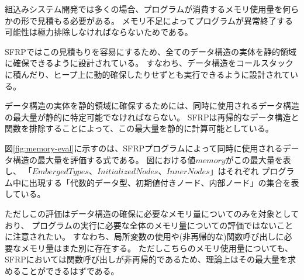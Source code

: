 組込みシステム開発では多くの場合、プログラムが消費するメモリ使用量を何らかの形で見積もる必要がある。
メモリ不足によってプログラムが異常終了する可能性は極力排除しなければならないためである。

SFRPではこの見積もりを容易にするため、全てのデータ構造の実体を静的領域に確保できるように設計されている。
すなわち、データ構造をコールスタックに積んだり、ヒープ上に動的確保したりせずとも実行できるように設計されている。

データ構造の実体を静的領域に確保するためには、同時に使用されるデータ構造の最大量が静的に特定可能でなければならない。
SFRPは再帰的なデータ構造と関数を排除することによって、この最大量を静的に計算可能としている。

図\ref{fig:memory-eval}に示すのは、SFRPプログラムによって同時に使用されるデータ構造の最大量を評価する式である。
図における値$memory$がこの最大量を表し、
「$EmbergedTypes$、$InitializedNodes$、$InnerNodes$」はそれぞれ
プログラム中に出現する「代数的データ型、初期値付きノード、内部ノード」の集合を表している。

ただしこの評価はデータ構造の確保に必要なメモリ量についてのみを対象としており、
プログラムの実行に必要な全体のメモリ量についての評価ではないことに注意されたい。
すなわち、局所変数の使用や(非再帰的な)関数呼び出しに必要なメモリ量はまた別に存在する。
ただしこちらのメモリ使用量についても、SFRPにおいては関数呼び出しが非再帰的であるため、理論上はその最大量を求めることができるはずである。


